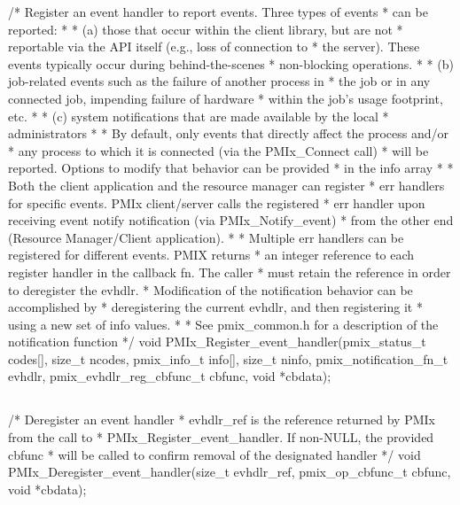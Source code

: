 \cspecificstart
\begin{codepar}
/* Register an event handler to report events. Three types of events
 * can be reported:
 *
 * (a) those that occur within the client library, but are not
 *     reportable via the API itself (e.g., loss of connection to
 *     the server). These events typically occur during behind-the-scenes
 *     non-blocking operations.
 *
 * (b) job-related events such as the failure of another process in
 *     the job or in any connected job, impending failure of hardware
 *     within the job's usage footprint, etc.
 *
 * (c) system notifications that are made available by the local
 *     administrators
 *
 * By default, only events that directly affect the process and/or
 * any process to which it is connected (via the PMIx_Connect call)
 * will be reported. Options to modify that behavior can be provided
 * in the info array
 *
 * Both the client application and the resource manager can register
 * err handlers for specific events. PMIx client/server calls the registered
 * err handler upon receiving event notify notification (via PMIx_Notify_event)
 * from the other end (Resource Manager/Client application).
 *
 * Multiple err handlers can be registered for different events. PMIX returns
 * an integer reference to each register handler in the callback fn. The caller
 * must retain the reference in order to deregister the evhdlr.
 * Modification of the notification behavior can be accomplished by
 * deregistering the current evhdlr, and then registering it
 * using a new set of info values.
 *
 * See pmix_common.h for a description of the notification function */
void
PMIx_Register_event_handler(pmix_status_t codes[], size_t ncodes,
                            pmix_info_t info[], size_t ninfo,
                            pmix_notification_fn_t evhdlr,
                            pmix_evhdlr_reg_cbfunc_t cbfunc,
                            void *cbdata);
\end{codepar}
\cspecificend


\subsection{}

\cspecificstart
\begin{codepar}
/* Deregister an event handler
 * evhdlr_ref is the reference returned by PMIx from the call to
 * PMIx_Register_event_handler. If non-NULL, the provided cbfunc
 * will be called to confirm removal of the designated handler */
void
PMIx_Deregister_event_handler(size_t evhdlr_ref,
                              pmix_op_cbfunc_t cbfunc,
                              void *cbdata);
\end{codepar}
\cspecificend


